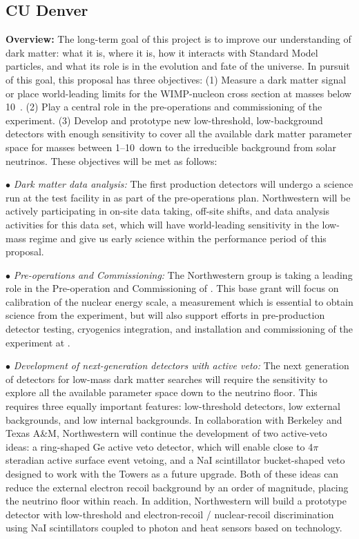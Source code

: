 \subsection{CU Denver}
{\bf Overview:} The long-term goal of this project is to improve our understanding of dark matter: what it is, where it is, how it interacts with Standard Model particles, and what its role is in the evolution and fate of the universe. In pursuit of this goal, this proposal has three objectives: (1) Measure a dark matter signal or place world-leading limits for the WIMP-nucleon cross section at masses below 10~\gev. (2) Play a central role in the pre-operations and commissioning of the \scs experiment. (3) Develop and prototype new low-threshold, low-background detectors with enough sensitivity to cover all the available dark matter parameter space for masses between 1--10~\gev down to the irreducible background from solar neutrinos. These objectives will be met as follows:

{$\bullet$ \it Dark matter data analysis:} The first production \scs detectors will undergo a science run at the \cute test facility in \SNOLAB as part of the pre-operations plan. Northwestern will be actively participating in on-site data taking, off-site shifts, and data analysis activities for this data set, which will have world-leading sensitivity in the low-mass regime and give us early \scs science within the performance period of this proposal.

{$\bullet$ \it Pre-operations and Commissioning:} The Northwestern group is taking a leading role in the Pre-operation and Commissioning of \scs. This base grant will focus on calibration of the nuclear energy scale, a measurement which is essential to obtain science from the experiment, but will also support efforts in pre-production detector testing, cryogenics integration, and installation and commissioning of the experiment at \SNOLAB. 

{$\bullet$ \it Development of next-generation detectors with active veto:} The next generation of detectors for low-mass dark matter searches will require the sensitivity to explore all the available parameter space down to the neutrino floor. This requires three equally important features: low-threshold detectors, low external backgrounds, and low internal backgrounds. In collaboration with Berkeley and Texas A\&M, Northwestern will continue the development of two active-veto ideas: a ring-shaped Ge active veto detector, which will enable close to 4$\pi$ steradian active surface event vetoing, and a NaI scintillator bucket-shaped veto designed to work with the \scs Towers as a future upgrade. Both of these ideas can reduce the external electron recoil background by an order of magnitude, placing the neutrino floor within reach. In addition, Northwestern will build a prototype detector with low-threshold and electron-recoil / nuclear-recoil discrimination using NaI scintillators coupled to photon and heat sensors based on \CDMS technology.

